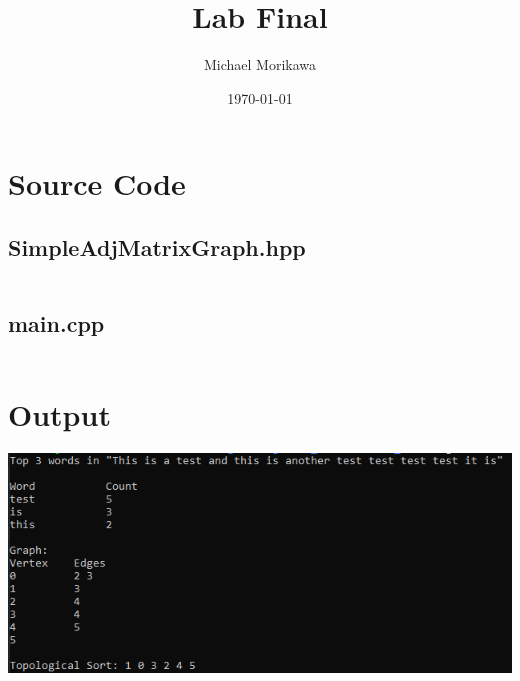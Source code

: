 \documentclass{article}
\title{Lab Final}
\author{Michael Morikawa}
\date{\today}
\begin{document}
\maketitle



\section{Source Code}
\subsection{SimpleAdjMatrixGraph.hpp}
\inputminted{c++}{../include/SimpleAdjMatrixGraph.hpp}
\subsection{main.cpp}
\inputminted{c++}{../src/main.cpp}

\section{Output}
\includegraphics[]{output.png}
\end{document}

